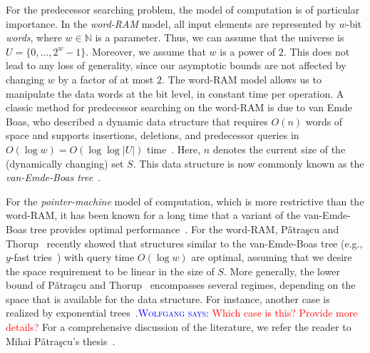 \documentclass[a4paper,11pt]{article}
\newcommand{\N}{\mathbb{N}}
\newcommand{\?}{\mskip1.5mu}
\newcommand{\Patrascu}{P\v{a}tra\c{s}cu\xspace}
\newcommand{\aremark}[3]{\textcolor{blue}{\textsc{#1 #2:}}
  \textcolor{red}{\textsf{#3}}}
\newcommand{\wolfgang}[2][says]{\aremark{Wolfgang}{#1}{#2}}
\begin{document}
For the predecessor searching problem, the model 
of computation is of particular importance. In 
the \emph{word-RAM} model, all input elements 
are represented by $w$-bit \emph{words}, where 
$w \in \N$ is a parameter. Thus, we can assume 
that the universe is $U = \{0, \dots, 2^{w}-1\}$. 
Moreover, we assume that $w$ 
is a power of $2$. This does not lead to any 
loss of generality, since our asymptotic bounds 
are not affected by changing $w$ by a factor of 
at most $2$. The word-RAM model allows us to 
manipulate the data words at the bit level, 
in constant time per operation. A classic 
method for predecessor searching on the 
word-RAM is due to van Emde Boas, who described 
a dynamic data structure that requires $O(n)$ words
of space and supports insertions, deletions, and 
predecessor queries in 
$O(\log w) = O(\log\log |U|)$ 
time~\cite{vEmdeBoas77,vEmdeBoasKaZi76,CormenLeRiSt09}.
Here, $n$ denotes the current size of the
(dynamically changing) set $S$. This data 
structure is now commonly known as the 
\emph{van-Emde-Boas tree}~\cite{CormenLeRiSt09}.

For the \emph{pointer-machine} model of computation, 
which is more restrictive than the word-RAM, it has 
been known for a long time that a variant of the 
van-Emde-Boas tree provides optimal 
performance~\cite{MehlhornNaAl88,Mulzer09}.
For the word-RAM, \Patrascu and Thorup~\cite{PatrascuTh06,PatrascuTh07} 
recently showed that structures similar to the 
van-Emde-Boas tree (e.g., $y$-fast tries~\cite{Willard83}) 
with query time $O(\log w)$ are optimal, assuming that 
we desire the space requirement to be linear in the 
size of $S$. More generally, the lower bound of 
\Patrascu and Thorup~\cite{PatrascuTh06,PatrascuTh07} 
encompasses several regimes, depending on the 
space that is available for the data structure.
For instance, another case is realized by exponential 
trees~\cite{AnderssonTh07}.\wolfgang{Which case is this?
Provide more details?} 
For a comprehensive discussion of the literature, we refer
the reader to Mihai \Patrascu's thesis~\cite{Patrascu08}.
\end{document}
